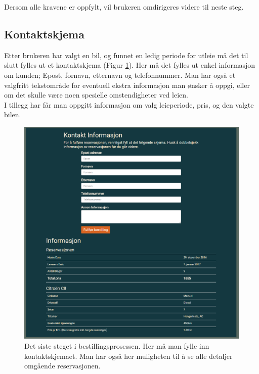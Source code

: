 Dersom alle kravene er oppfylt, vil brukeren omdirigeres videre til neste steg.




\subsection{Kontaktskjema}
Etter brukeren har valgt en bil, og funnet en ledig periode for utleie må det til slutt fylles ut et kontaktskjema (Figur \ref{fig:rv_customercontact}). Her må det fylles ut enkel informasjon om kunden; Epost, fornavn, etternavn og telefonnummer. Man har også et valgfritt tekstområde for eventuell ekstra informasjon man ønsker å oppgi, eller om det skulle være noen spesielle omstendigheter ved leien.
\\
I tillegg har får man oppgitt informasjon om valg leieperiode, pris, og den valgte bilen. 

 \begin{figure}[htbp]
	\centering
		\includegraphics[scale=0.5]{Bilder/rv_customercontact.png}
	\caption[Kontaktskjema]{Det siste steget i bestillingsprosessen. Her må man fylle inn kontaktskjemaet. Man har også her muligheten til å se alle detaljer omgående reservasjonen.} %
	\label{fig:rv_customercontact}
\end{figure}


